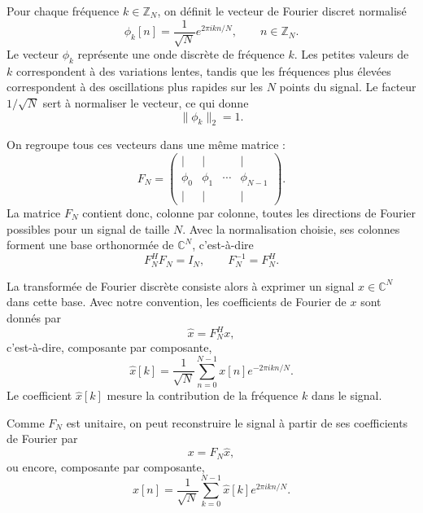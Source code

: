 Pour chaque fréquence $k\in\mathbb{Z}_N$, on définit le vecteur de Fourier discret normalisé
\begin{equation}
    \phi_k[n]
    =
    \frac{1}{\sqrt{N}}
    e^{2\pi i kn/N},
    \qquad n\in\mathbb{Z}_N.
    \label{eq:def_base_fourier_1d}
\end{equation}
Le vecteur $\phi_k$ représente une onde discrète de fréquence $k$. Les petites valeurs de $k$
correspondent à des variations lentes, tandis que les fréquences plus élevées correspondent à des
oscillations plus rapides sur les $N$ points du signal. Le facteur $1/\sqrt{N}$ sert à normaliser le
vecteur, ce qui donne
\[
    \|\phi_k\|_2 = 1.
\]

On regroupe tous ces vecteurs dans une même matrice :
\begin{equation}
    F_N
    =
    \begin{pmatrix}
    | & | &        & | \\
    \phi_0 & \phi_1 & \cdots & \phi_{N-1} \\
    | & | &        & |
    \end{pmatrix}.
    \label{eq:def_matrice_fourier_1d}
\end{equation}
La matrice $F_N$ contient donc, colonne par colonne, toutes les directions de Fourier possibles
pour un signal de taille $N$. Avec la normalisation choisie, ses colonnes forment une base
orthonormée de $\mathbb{C}^N$, c'est-à-dire
\[
    F_N^H F_N = I_N,
    \qquad
    F_N^{-1}=F_N^H.
\]

La transformée de Fourier discrète consiste alors à exprimer un signal
$x\in\mathbb{C}^N$ dans cette base. Avec notre convention, les coefficients de Fourier de $x$ sont
donnés par
\begin{equation}
    \widehat{x}
    =
    F_N^H x,
\end{equation}
c'est-à-dire, composante par composante,
\begin{equation}
    \widehat{x}[k]
    =
    \frac{1}{\sqrt{N}}
    \sum_{n=0}^{N-1}
    x[n]e^{-2\pi i kn/N}.
    \label{eq:def_dft_1d}
\end{equation}
Le coefficient $\widehat{x}[k]$ mesure la contribution de la fréquence $k$ dans le signal.

Comme $F_N$ est unitaire, on peut reconstruire le signal à partir de ses coefficients de Fourier par
\begin{equation}
    x
    =
    F_N\widehat{x},
\end{equation}
ou encore, composante par composante,
\begin{equation}
    x[n]
    =
    \frac{1}{\sqrt{N}}
    \sum_{k=0}^{N-1}
    \widehat{x}[k]e^{2\pi i kn/N}.
    \label{eq:def_idft_1d}
\end{equation}

